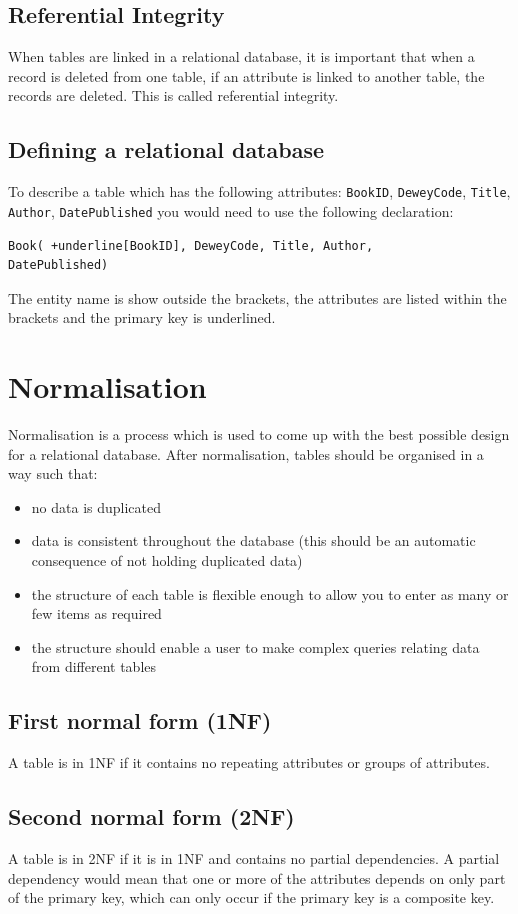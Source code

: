 \documentclass[a4paper,11pt, twocolumn]{article}
\begin{document}
\subsection{Referential Integrity}
When tables are linked in a relational database, it is important that when a record is deleted from one table, if an attribute is linked to another table, the records are deleted. This is called referential integrity.

\subsection{Defining a relational database}
To describe a table which has the following attributes: \verb|BookID|, \verb|DeweyCode|, \verb|Title|, \verb|Author|, \verb|DatePublished| you would need to use the following declaration:
\begin{Verbatim}[commandchars=+\[\]]
Book( +underline[BookID], DeweyCode, Title, Author, 
DatePublished)
\end{Verbatim}
The entity name is show outside the brackets, the attributes are listed within the brackets and the primary key is underlined. 

\section{Normalisation}
Normalisation is a process which is used to come up with the best possible design for a relational database. After normalisation, tables should be organised in a way such that:
\begin{itemize}
    \item no data is duplicated
    \item data is consistent throughout the database (this should be an automatic consequence of not holding duplicated data)
    \item the structure of each table is flexible enough to allow you to enter as many or few items as required
    \item the structure should enable a user to make complex queries relating data from different tables
\end{itemize}
\subsection{First normal form (1NF)}
A table is in 1NF if it contains no repeating attributes or groups of attributes. 
\subsection{Second normal form (2NF)}
A table is in 2NF if it is in 1NF and contains no partial dependencies. A partial dependency would mean that one or more of the attributes depends on only part of the primary key, which can only occur if the primary key is a composite key.
\end{document}
